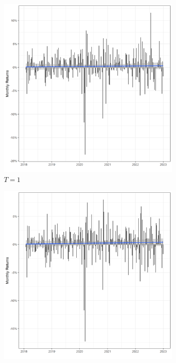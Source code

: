 \begin{figure}
     \centering
     \caption{Long run portfolio returns from positive events}
     \begin{subfigure}[b]{0.49\textwidth}
         \centering
         \includegraphics[width=\textwidth]{Projekt/1.Figures analysis/LT_positive_returns_1.png}
         \caption{$T = 1$}
         \label{fig:y equals x}
     \end{subfigure}
     \hfill
     \begin{subfigure}[b]{0.49\textwidth}
         \centering
         \includegraphics[width=\textwidth]{Projekt/1.Figures analysis/LT_positive_returns_3.png}

\end{subfigure}
\end{figure}
